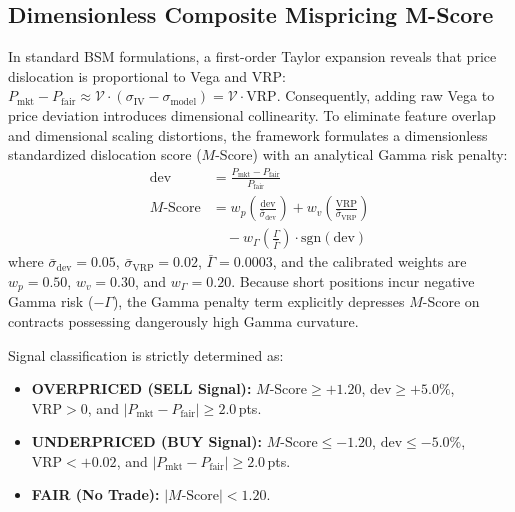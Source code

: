 \documentclass[journal]{IEEEtran}
\begin{document}
\subsection{Dimensionless Composite Mispricing M-Score}
In standard BSM formulations, a first-order Taylor expansion reveals that price dislocation is proportional to Vega and VRP: $P_{\mathrm{mkt}} - P_{\mathrm{fair}} \approx \mathcal{V} \cdot (\sigma_{\mathrm{IV}} - \sigma_{\mathrm{model}}) = \mathcal{V} \cdot \mathrm{VRP}$. Consequently, adding raw Vega to price deviation introduces dimensional collinearity. To eliminate feature overlap and dimensional scaling distortions, the framework formulates a dimensionless standardized dislocation score ($M$-Score) with an analytical Gamma risk penalty:
\begin{equation}
\begin{aligned}
\mathrm{dev} &= \frac{P_{\mathrm{mkt}} - P_{\mathrm{fair}}}{P_{\mathrm{fair}}} \\
M\text{-Score} &= w_p \left( \frac{\mathrm{dev}}{\bar{\sigma}_{\mathrm{dev}}} \right) + w_v \left( \frac{\mathrm{VRP}}{\bar{\sigma}_{\mathrm{VRP}}} \right) \\
&\quad - w_{\Gamma} \left( \frac{\Gamma}{\bar{\Gamma}} \right) \cdot \mathrm{sgn}(\mathrm{dev})
\end{aligned}
\end{equation}
where $\bar{\sigma}_{\mathrm{dev}} = 0.05$, $\bar{\sigma}_{\mathrm{VRP}} = 0.02$, $\bar{\Gamma} = 0.0003$, and the calibrated weights are $w_p = 0.50$, $w_v = 0.30$, and $w_{\Gamma} = 0.20$. Because short positions incur negative Gamma risk ($-\Gamma$), the Gamma penalty term explicitly depresses $M$-Score on contracts possessing dangerously high Gamma curvature.

Signal classification is strictly determined as:
\begin{itemize}
    \item \textbf{OVERPRICED (SELL Signal):} $M\text{-Score} \ge +1.20$, $\mathrm{dev} \ge +5.0\%$, $\mathrm{VRP} > 0$, and $|P_{\mathrm{mkt}} - P_{\mathrm{fair}}| \ge 2.0$\,pts.
    \item \textbf{UNDERPRICED (BUY Signal):} $M\text{-Score} \le -1.20$, $\mathrm{dev} \le -5.0\%$, $\mathrm{VRP} < +0.02$, and $|P_{\mathrm{mkt}} - P_{\mathrm{fair}}| \ge 2.0$\,pts.
    \item \textbf{FAIR (No Trade):} $|M\text{-Score}| < 1.20$.
\end{itemize}
\end{document}

